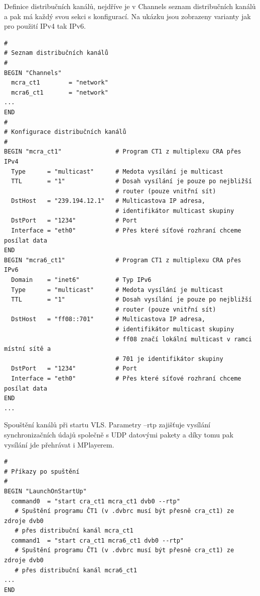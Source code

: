 \vspace{10pt}

Definice distribučních kanálů, nejdříve je v Channels seznam distribučních kanálů a pak má každý svou sekci s konfigurací. Na ukázku jsou zobrazeny varianty jak pro použití IPv4 tak IPv6.

\vspace{10pt}

\begin{small}
\begin{verbatim}
#
# Seznam distribučních kanálů
#
BEGIN "Channels"
  mcra_ct1        = "network"
  mcra6_ct1       = "network"
...
END
#
# Konfigurace distribučních kanálů
#
BEGIN "mcra_ct1"               # Program CT1 z multiplexu CRA přes IPv4
  Type      = "multicast"      # Medota vysílání je multicast
  TTL       = "1"              # Dosah vysílání je pouze po nejbližší 
                               # router (pouze vnitřní sít)
  DstHost   = "239.194.12.1"   # Multicastova IP adresa, 
                               # identifikátor multicast skupiny
  DstPort   = "1234"           # Port
  Interface = "eth0"           # Přes které síťové rozhraní chceme posílat data
END
BEGIN "mcra6_ct1"              # Program CT1 z multiplexu CRA přes IPv6
  Domain    = "inet6"          # Typ IPv6
  Type      = "multicast"      # Medota vysílání je multicast
  TTL       = "1"              # Dosah vysílání je pouze po nejbližší 
                               # router (pouze vnitřní sít)
  DstHost   = "ff08::701"      # Multicastova IP adresa, 
                               # identifikátor multicast skupiny
                               # ff08 značí lokální multicast v ramci místní sítě a 
                               # 701 je identifikátor skupiny
  DstPort   = "1234"           # Port
  Interface = "eth0"           # Přes které síťové rozhraní chceme posílat data
END
...

\end{verbatim}
\end{small}

\vspace{10pt}

Spouštění kanálů při startu VLS. Parametry --rtp zajišťuje vysílání synchronizačních údajů společně s UDP datovými pakety a díky tomu pak vysílání jde přehrávat i MPlayerem.

\vspace{10pt}

\begin{small}
\begin{verbatim}
#
# Příkazy po spuštění
#
BEGIN "LaunchOnStartUp"
  command0  = "start cra_ct1 mcra_ct1 dvb0 --rtp"
   # Spuštění programu ČT1 (v .dvbrc musí být přesně cra_ct1) ze zdroje dvb0 
   # přes distribuční kanál mcra_ct1
  command1  = "start cra_ct1 mcra6_ct1 dvb0 --rtp"   
   # Spuštění programu ČT1 (v .dvbrc musí být přesně cra_ct1) ze zdroje dvb0 
   # přes distribuční kanál mcra6_ct1
...
END

\end{verbatim}
\end{small}

